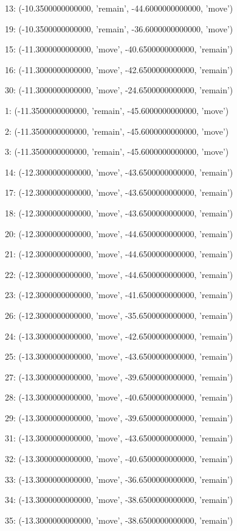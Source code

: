 13: (-10.3500000000000, 'remain', -44.6000000000000, 'move')


19: (-10.3500000000000, 'remain', -36.6000000000000, 'move')


15: (-11.3000000000000, 'move', -40.6500000000000, 'remain')


16: (-11.3000000000000, 'move', -42.6500000000000, 'remain')


30: (-11.3000000000000, 'move', -24.6500000000000, 'remain')


1: (-11.3500000000000, 'remain', -45.6000000000000, 'move')


2: (-11.3500000000000, 'remain', -45.6000000000000, 'move')


3: (-11.3500000000000, 'remain', -45.6000000000000, 'move')


14: (-12.3000000000000, 'move', -43.6500000000000, 'remain')


17: (-12.3000000000000, 'move', -43.6500000000000, 'remain')


18: (-12.3000000000000, 'move', -43.6500000000000, 'remain')


20: (-12.3000000000000, 'move', -44.6500000000000, 'remain')


21: (-12.3000000000000, 'move', -44.6500000000000, 'remain')


22: (-12.3000000000000, 'move', -44.6500000000000, 'remain')


23: (-12.3000000000000, 'move', -41.6500000000000, 'remain')


26: (-12.3000000000000, 'move', -35.6500000000000, 'remain')


24: (-13.3000000000000, 'move', -42.6500000000000, 'remain')


25: (-13.3000000000000, 'move', -43.6500000000000, 'remain')


27: (-13.3000000000000, 'move', -39.6500000000000, 'remain')


28: (-13.3000000000000, 'move', -40.6500000000000, 'remain')


29: (-13.3000000000000, 'move', -39.6500000000000, 'remain')


31: (-13.3000000000000, 'move', -43.6500000000000, 'remain')


32: (-13.3000000000000, 'move', -40.6500000000000, 'remain')


33: (-13.3000000000000, 'move', -36.6500000000000, 'remain')


34: (-13.3000000000000, 'move', -38.6500000000000, 'remain')


35: (-13.3000000000000, 'move', -38.6500000000000, 'remain')


